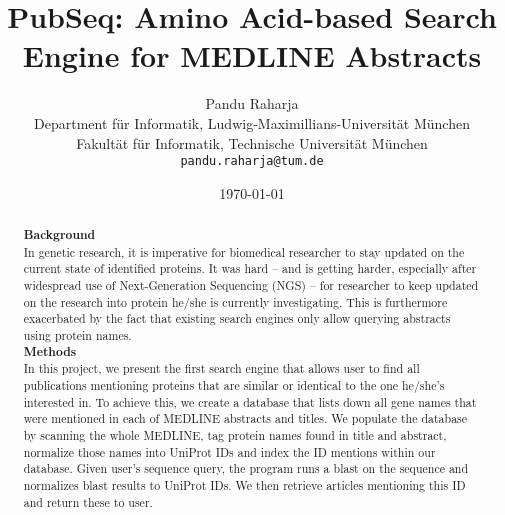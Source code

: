 \documentclass[a4paper, %
  11pt, %
  twoside
  ]{report} %
\begin{document}
\title{PubSeq: Amino Acid-based Search Engine for MEDLINE Abstracts}
\author{Pandu Raharja\\
  Department f\"ur Informatik,
  Ludwig-Maximillians-Universit\"at M\"unchen\\
  Fakult\"at f\"ur Informatik,
  Technische Universit\"at M\"unchen\\
  \texttt{pandu.raharja@tum.de}}
\date{\today}
\maketitle

\begin{abstract}
\textbf{Background}\\
In genetic research, it is imperative for biomedical researcher to stay updated on the current  state of identified proteins. It was hard -- and is getting harder, especially after widespread use of Next-Generation Sequencing (NGS) -- for researcher to keep updated on the research into protein he/she is currently investigating. This is furthermore exacerbated by the fact that existing search engines only allow querying abstracts using protein names.\\
\noindent
\textbf{Methods}\\
In this project, we present the first search engine that allows user to find all publications mentioning proteins that are similar or identical to the one he/she's interested in. To achieve this, we create a database that lists down all gene names that were mentioned in each of MEDLINE abstracts and titles. We populate the database by scanning the whole MEDLINE, tag protein names found in title and abstract, normalize those names into UniProt IDs and index the ID mentions within our database. Given user's sequence query, the program runs a blast on the sequence and normalizes blast results to UniProt IDs. We then retrieve articles mentioning this ID and return 
these to user.
\end{abstract}
\end{document}
